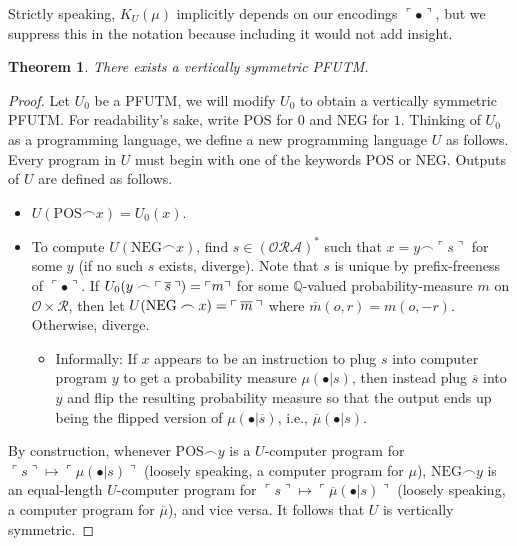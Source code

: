 \documentclass{article}
\newtheorem{theorem}{Theorem}
\begin{document}
Strictly speaking, $K_U(\mu)$ implicitly depends on our encodings
$\ulcorner \bullet\urcorner$, but we suppress this in the notation because
including it would not add insight.

\begin{theorem}
\label{envirosymmetricexistencelemma}
    There exists a vertically symmetric PFUTM.
\end{theorem}

\begin{proof}
    Let $U_0$ be a PFUTM, we will modify $U_0$ to obtain a vertically symmetric PFUTM.
    For readability's sake, write $\mathrm{POS}$ for $0$ and $\mathrm{NEG}$ for $1$.
    Thinking of $U_0$ as a programming language, we define a new programming language
    $U$ as follows. Every program in $U$ must begin with one of the keywords
    $\mathrm{POS}$ or $\mathrm{NEG}$. Outputs of $U$ are defined as follows.
    \begin{itemize}
        \item $U(\mathrm{POS}\frown x)=U_0(x)$.
        \item To compute $U(\mathrm{NEG}\frown x)$, find
        $s\in (\mathcal O \mathcal R\mathcal A)^*$ such that
        $x=y\frown \ulcorner s\urcorner$ for some $y$ (if no such $s$ exists, diverge).
        Note that $s$ is unique by prefix-freeness of $\ulcorner\bullet\urcorner$.
        If $
            U_0(y\frown
            \ulcorner \hspace{.2em} \overline s\hspace{.2em}\urcorner)
            =\ulcorner m\urcorner
        $
        for some $\mathbb Q$-valued probability-measure $m$ on
        $\mathcal O\times\mathcal R$, then let
        $U(\mathrm{NEG}\frown x)=\ulcorner\hspace{.2em} \overline m\hspace{.2em}\urcorner$
        where $\overline m(o,r)=m(o,-r)$.
        Otherwise, diverge.
        \begin{itemize}
            \item Informally:
            If $x$ appears to be an instruction to plug $s$ into computer
            program $y$ to get a probability measure $\mu(\bullet|s)$, then
            instead plug $\overline s$ into $y$ and flip the resulting
            probability measure so that the output
            ends up being the flipped version of $\mu(\bullet|\overline s)$,
            i.e., $\overline \mu(\bullet|s)$.
        \end{itemize}
    \end{itemize}
    By construction, whenever $\mathrm{POS}\frown y$ is a $U$-computer program
    for $\ulcorner s\urcorner\mapsto \ulcorner \mu(\bullet|s)\urcorner$
    (loosely speaking, a computer program for $\mu$),
    $\mathrm{NEG}\frown y$ is an equal-length $U$-computer program
    for $\ulcorner s\urcorner\mapsto \ulcorner \overline\mu(\bullet|s)\urcorner$
    (loosely speaking, a computer program for $\overline \mu$),
    and vice versa.
    It follows that $U$ is vertically symmetric.
\end{proof}
\end{document}
